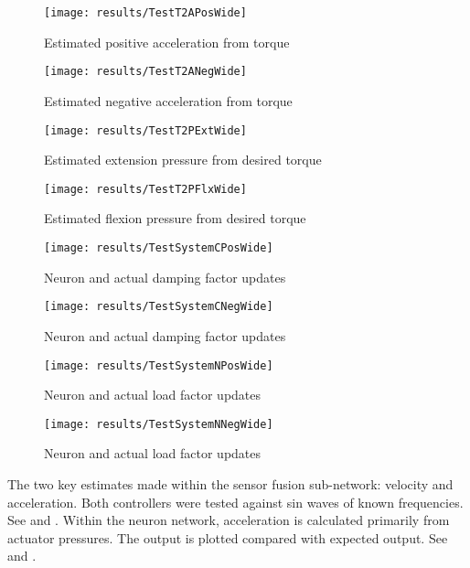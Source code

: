 \begin{figure}
\centering
\texttt{[image: results/TestT2APosWide]}
\caption{Estimated positive acceleration from torque}
\label{fig:TestT2APos}
\end{figure}

\begin{figure}
\centering
\texttt{[image: results/TestT2ANegWide]}
\caption{Estimated negative acceleration from torque}
\label{fig:TestT2ANeg}
\end{figure}

\begin{figure}
\centering
\texttt{[image: results/TestT2PExtWide]}
\caption{Estimated extension pressure from desired torque}
\label{fig:TestT2PPos}
\end{figure}

\begin{figure}
\centering
\texttt{[image: results/TestT2PFlxWide]}
\caption{Estimated flexion pressure from desired torque}
\label{fig:TestT2PNeg}
\end{figure}

\begin{figure}
\centering
\texttt{[image: results/TestSystemCPosWide]}
\caption{Neuron and actual damping factor updates}
\label{fig:TestSystemCPos}
\end{figure}

\begin{figure}
\centering
\texttt{[image: results/TestSystemCNegWide]}
\caption{Neuron and actual damping factor updates}
\label{fig:TestSystemCNeg}
\end{figure}

\begin{figure}
\centering
\texttt{[image: results/TestSystemNPosWide]}
\caption{Neuron and actual load factor updates}
\label{fig:TestSystemNPos}
\end{figure}

\begin{figure}
\centering
\texttt{[image: results/TestSystemNNegWide]}
\caption{Neuron and actual load factor updates}
\label{fig:TestSystemNNeg}
\end{figure}


The two key estimates made within the sensor fusion sub-network: velocity and
acceleration. Both controllers were tested against sin waves of known
frequencies. See  and .
Within the neuron network, acceleration is calculated primarily from actuator
pressures. The output is plotted compared with expected output. See
 and .


